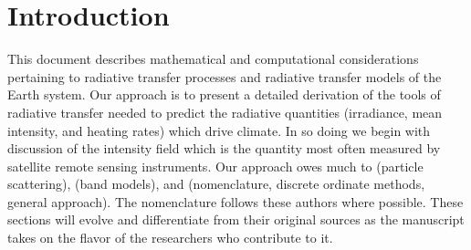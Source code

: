 \documentclass[12pt]{article}
\begin{document}
\setcounter{page}{1}
\pagestyle{headings}
\thispagestyle{empty}

\clearpage
\tableofcontents
\listoffigures
\listoftables
\clearpage

\setcounter{page}{1}
\thispagestyle{empty}

\section{Introduction}\label{sxn:ntr}

This document describes mathematical and computational considerations 
pertaining to radiative transfer processes and radiative transfer
models of the Earth system. 
Our approach is to present a detailed derivation of the tools of
radiative transfer needed to predict the radiative quantities
(irradiance, mean intensity, and heating rates) which drive climate. 
In so doing we begin with discussion of the intensity field which is
the quantity most often measured by satellite remote sensing
instruments. 
Our approach owes much to \cite{BoH83} (particle scattering), 
\cite{GoY89} (band models), and \cite{ThS99} (nomenclature,
discrete ordinate methods, general approach).
The nomenclature follows these authors where possible.
These sections will evolve and differentiate from their original 
sources as the manuscript takes on the flavor of the researchers who
contribute to it. 
\end{document}
